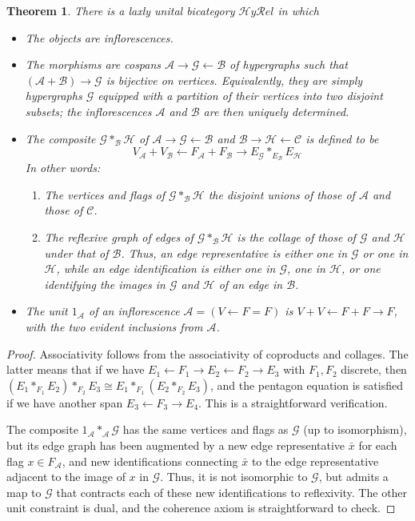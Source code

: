 \documentclass{article}
\newtheorem{thm}{Theorem}[section]
\theoremstyle{definition}
\theoremstyle{remark}
\def\A{\mathcal{A}}
\def\B{\mathcal{B}}
\def\C{\mathcal{C}}
\def\G{\mathcal{G}}
\def\H{\mathcal{H}}
\let\ot\leftarrow
\def\hyrel{\mathcal{H}\mathit{y}\mathcal{R}\mathit{el}}
\begin{document}
\begin{thm}
  There is a laxly unital bicategory $\hyrel$ in which
  \begin{itemize}
  \item The objects are inflorescences.
  \item The morphisms are cospans $\A \to \G \ot \B$ of hypergraphs such that $(\A+\B) \to \G$ is bijective on vertices.
    Equivalently, they are simply hypergraphs $\G$ equipped with a partition of their vertices into two disjoint subsets; the inflorescences $\A$ and $\B$ are then uniquely determined.
  \item The composite $\G *_{\B} \H$ of $\A \to \G \ot \B$ and $\B \to \H \ot \C$ is defined to be
    \[ V_{\A}  + V_{\B} \longleftarrow F_{\A} + F_{\B} \longrightarrow E_{\G} *_{E_\B} E_{\H} \]
    In other words:
    \begin{enumerate}
    \item The vertices and flags of $\G *_{\B} \H$ the disjoint unions of those of $\A$ and those of $\C$.
    \item The reflexive graph of edges of $\G *_{\B} \H$ is the collage of those of $\G$ and $\H$ under that of $\B$.
      Thus, an edge representative is either one in $\G$ or one in $\H$, while an edge identification is either one in $\G$, one in $\H$, or one identifying the images in $\G$ and $\H$ of an edge in $\B$.
    \end{enumerate}
  \item The unit $1_{\A}$ of an inflorescence $\A=(V\ot F = F)$ is $V+V \ot F+F \to F$, with the two evident inclusions from $\A$.
  \end{itemize}
\end{thm}
\begin{proof}
  Associativity follows from the associativity of coproducts and collages.
  The latter means that if we have $E_1 \ot F_1 \to E_2 \ot F_2 \to E_3$ with $F_1,F_2$ discrete, then $(E_1 *_{F_1} E_2) *_{F_2} E_3 \cong E_1 *_{F_1} (E_2 *_{F_2} E_3)$, and the pentagon equation is satisfied if we have another span $E_3 \ot F_3 \to E_4$.
  This is a straightforward verification.

  The composite $1_{\A} *_{\A} \G$ has the same vertices and flags as $\G$ (up to isomorphism), but its edge graph has been augmented by a new edge representative $\bar{x}$ for each flag $x\in F_{\A}$, and new identifications connecting $\bar{x}$ to the edge representative adjacent to the image of $x$ in $\G$.
  Thus, it is not isomorphic to $\G$, but admits a map to $\G$ that contracts each of these new identifications to reflexivity.
  The other unit constraint is dual, and the coherence axiom is straightforward to check.
\end{proof}
\end{document}
